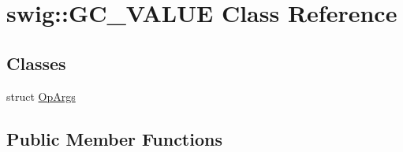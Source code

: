 \hypertarget{classswig_1_1GC__VALUE}{}\section{swig\+:\+:G\+C\+\_\+\+V\+A\+L\+UE Class Reference}
\label{classswig_1_1GC__VALUE}
\subsection*{Classes}
\begin{DoxyCompactItemize}
\item 
struct \hyperlink{structswig_1_1GC__VALUE_1_1OpArgs}{Op\+Args}
\end{DoxyCompactItemize}
\subsection*{Public Member Functions}
